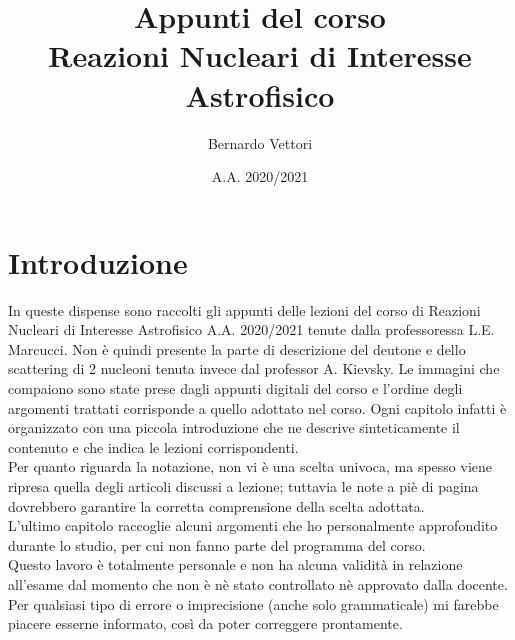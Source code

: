 \documentclass[12pt,a4paper,titlepage,openany]{book}
\title{Appunti del corso\\Reazioni Nucleari di Interesse Astrofisico}
\author{Bernardo Vettori}
\date{A.A. 2020/2021}
\begin{document}
\frontmatter
\maketitle
\chapter*{Introduzione}
\noindent In queste dispense sono raccolti gli appunti delle lezioni del corso di Reazioni Nucleari di Interesse Astrofisico A.A. 2020/2021 tenute dalla professoressa L.E. Marcucci. Non è quindi presente la parte di descrizione del deutone e dello scattering di 2 nucleoni tenuta invece dal professor A. Kievsky. Le immagini che compaiono sono state prese dagli appunti digitali del corso e l'ordine degli argomenti trattati corrisponde a quello adottato nel corso. Ogni capitolo infatti è organizzato con una piccola introduzione che ne descrive sinteticamente il contenuto e che indica le lezioni corrispondenti.\\
Per quanto riguarda la notazione, non vi è una scelta univoca, ma spesso viene ripresa quella degli articoli discussi a lezione; tuttavia le note a piè di pagina dovrebbero garantire la corretta comprensione della scelta adottata.\\
L'ultimo capitolo \textit{} raccoglie alcuni argomenti che ho personalmente approfondito durante lo studio, per cui non fanno parte del programma del corso.\\
Questo lavoro è totalmente personale e non ha alcuna validità in relazione all'esame dal momento che non è nè stato controllato nè approvato dalla docente.
Per qualsiasi tipo di errore o imprecisione (anche solo grammaticale) mi farebbe piacere esserne informato, così da poter correggere prontamente.
\newpage
\tableofcontents
\mainmatter
\end{document}
